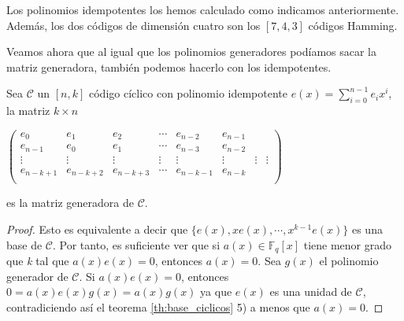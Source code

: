 \begin{exampleth}
\begin{tabular}{ c | c | c |}
	\end{tabular}

Los polinomios idempotentes los hemos calculado como indicamos anteriormente. Además, los dos códigos de dimensión cuatro son los $[7,4,3]$ códigos Hamming.

\end{exampleth}


Veamos ahora que al igual que los polinomios generadores podíamos sacar la matriz generadora, también podemos hacerlo con los idempotentes.

\begin{theorem}
Sea $\mathcal{C}$ un $[n,k]$ código cíclico con polinomio idempotente $e(x)= \sum_{i=0}^{n-1} e_ix^i$, la matriz $k \times n $

$ \begin{pmatrix}
			e_0 & e_1 & e_2 & \cdots & e_{n-2} & e_{n-1} \\
			e_{n-1} & e_0 & e_1 & \cdots  & e_{n-3} & e_{n-2} \\
			\vdots & \vdots & \vdots & \vdots & \vdots &\vdots & \vdots & \vdots \\
			e_{n-k+1} & e_{n-k+2} & e_{n-k+3} & \cdots  & e_{n-k-1} & e_{n-k} \\
	\end{pmatrix}$

es la matriz generadora de $\mathcal{C}$.
\end{theorem}

\begin{proof}
Esto es equivalente a decir que $\{ e(x),xe(x),\cdots,x^{k-1}e(x) \}$ es una base de $\mathcal{C}$. Por tanto,  es suficiente ver que si $a(x) \in \mathbb{F}_q[x]$ tiene menor grado que \textit{k} tal que $a(x)e(x)=0$, entonces $a(x)=0$. Sea $g(x)$ el polinomio generador de $\mathcal{C}$. Si $a(x)e(x)=0$, entonces $0 = a(x)e(x)g(x)= a(x)g(x)$ ya que $e(x)$ es una unidad de $\mathcal{C}$, contradiciendo así el teorema \ref{th:base_ciclicos} 5) a menos que $a(x) = 0$.
\end{proof}


